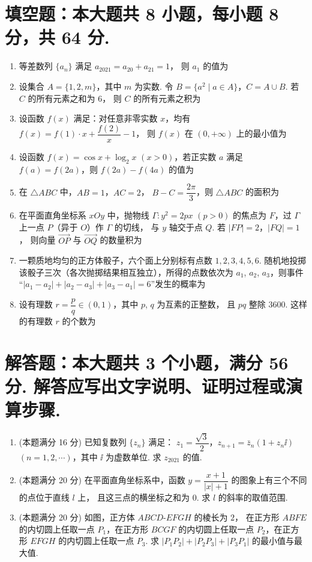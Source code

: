 \documentclass{chsmc}
\begin{document}
\section{填空题：本大题共 8 小题，每小题 8 分，共 64 分.}

\begin{enumerate}
  \item 等差数列 $\{a_n\}$ 满足 $a_{2021} = a_{20} + a_{21} = 1$，
    则 $a_1$ 的值为 \blankline
  \item 设集合 $A = \{1, 2, m\}$，其中 $m$ 为实数. 令
    $B = \{a^2 \mid a \in A\}$，$C = A \cup B$. 若 $C$ 的所有元素之和为 $6$，
    则 $C$ 的所有元素之积为 \blankline
  \item 设函数 $f(x)$ 满足：对任意非零实数 $x$，均有
    $f(x) = f(1)\cdot x + \dfrac{f(2)}{x} - 1$，
    则 $f(x)$ 在 $(0,+\infty)$ 上的最小值为 \blankline
  \item 设函数 $f(x) = \cos x + \log_2 x$ $(x > 0)$，若正实数 $a$ 满足
    $f(a) = f(2a)$，则 $f(2a) - f(4a)$ 的值为 \blankline
  \item 在 $\triangle ABC$ 中，$AB = 1$，$AC = 2$，
    $B - C = \dfrac{2\pi}{3}$，则 $\triangle ABC$ 的面积为 \blankline
  \item 在平面直角坐标系 $xOy$ 中，抛物线 $\Gamma\colon y^2 = 2px$ $(p > 0)$
    的焦点为 $F$，过 $\Gamma$ 上一点 $P$（异于 $O$）作 $\Gamma$ 的切线，
    与 $y$ 轴交于点 $Q$. 若 $|FP| = 2$，$|FQ| = 1$，
    则向量 $\overrightarrow{OP}$ 与 $\overrightarrow{OQ}$ 的数量积为 \blankline
  \item 一颗质地均匀的正方体骰子，六个面上分别标有点数 $1, 2, 3, 4, 5, 6$.
    随机地投掷该骰子三次（各次抛掷结果相互独立），所得的点数依次为
    $a_1$, $a_2$, $a_3$，则事件
    “$|a_1 - a_2| + |a_2 - a_3| + |a_3 - a_1| = 6$”发生的概率为 \blankline
  \item 设有理数 $r = \dfrac{p}{q} \in (0,1)$，其中 $p$, $q$ 为互素的正整数，
    且 $pq$ 整除 $3600$. 这样的有理数 $r$ 的个数为 \blankline
\end{enumerate}

\section{解答题：本大题共 3 个小题，满分 56 分. 解答应写出文字说明、证明过程或演算步骤.}

\begin{enumerate}[resume]
  \item (本题满分 16 分) 已知复数列 $\{z_n\}$ 满足：
    $z_1 = \dfrac{\sqrt{3}}{2}$，$z_{n+1} = \bar{z}_n(1 + z_n\ii)$
    $(n = 1, 2, \cdots)$，其中 $\ii$ 为虚数单位. 求 $z_{2021}$ 的值.
  \item (本题满分 20 分) 在平面直角坐标系中，函数
    $y = \dfrac{x+1}{|x|+1}$ 的图象上有三个不同的点位于直线 $l$ 上，
    且这三点的横坐标之和为 $0$. 求 $l$ 的斜率的取值范围.
  \item (本题满分 20 分) 如图，正方体 $ABCD\text{-}EFGH$ 的棱长为 $2$，
    在正方形 $ABFE$ 的内切圆上任取一点 $P_1$，在正方形 $BCGF$
    的内切圆上任取一点 $P_2$，在正方形 $EFGH$ 的内切圆上任取一点 $P_3$.
    求 $|P_1P_2| + |P_2P_3| + |P_3P_1|$ 的最小值与最大值.
\end{enumerate}
\end{document}
